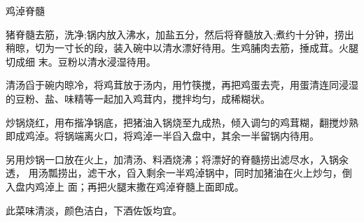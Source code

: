 \begin{recipe}{鸡淖脊髓}

\ingredients


\preparation

\step 猪脊髓去筋，洗净;锅内放入沸水，加盐五分，然后将脊髓放入;煮约十分钟，捞出
稍晾，切为一寸长的段，装入碗中以清水漂好待用。生鸡脯肉去筋，捶成茸。火腿切成细
末。豆粉以清水浸湿待用。

\step 清汤舀于碗内晾冷，将鸡茸放于汤内，用竹筷搅，再把鸡蛋去壳，用蛋清连同浸湿
的豆粉、盐、味精等一起加入鸡茸内，搅拌均匀，成稀糊状。

\step 炒锅烧红，用布揩净锅底，把猪油入锅烧至九成热，倾入调匀的鸡茸糊，翻搅炒熟
即成鸡淖。将锅端离火口，将鸡淖一半舀入盘中，其余一半留锅内待用。

\step 另用炒锅一口放在火上，加清汤、料酒烧沸；将漂好的脊髓捞出滤尽水，入锅汆透，
用汤瓢捞出，滤干水，舀入剩余一半鸡淖锅中，同时加猪油在火上炒匀，倒入盘内鸡淖上
面；再把火腿末撒在鸡淖脊髓上面即成。

\features

此菜味清淡，颜色洁白，下酒佐饭均宜。

\end{recipe}

